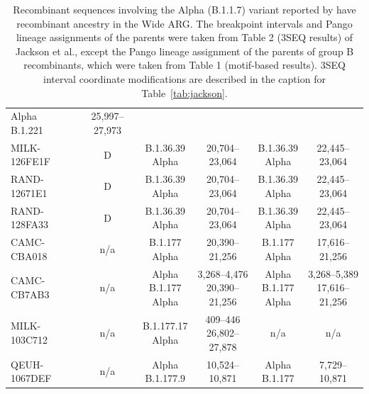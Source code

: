 \documentclass{article}
\begin{document}
\begin{table}
\begin{tabular}{l|c|c|c|c|c}
    \thead{Alpha \\ B.1.221} & 25,997--27,973 \\
MILK-126FE1F & D &
    \thead{B.1.36.39 \\ Alpha} & 20,704--23,064 &
    \thead{B.1.36.39 \\ Alpha} & 22,445--23,064 \\
RAND-12671E1 & D &
    \thead{B.1.36.39 \\ Alpha} & 20,704--23,064 &
    \thead{B.1.36.39 \\ Alpha} & 22,445--23,064 \\
RAND-128FA33 & D &
    \thead{B.1.36.39 \\ Alpha} & 20,704--23,064 &
    \thead{B.1.36.39 \\ Alpha} & 22,445--23,064 \\
CAMC-CBA018 & n/a &
    \thead{B.1.177 \\ Alpha} & 20,390--21,256 &
    \thead{B.1.177 \\ Alpha} & 17,616--21,256 \\
CAMC-CB7AB3 & n/a &
    \thead{Alpha \\ B.1.177 \\ Alpha} & \thead{3,268--4,476 \\ 20,390--21,256} &
    \thead{Alpha \\ B.1.177 \\ Alpha} & \thead{3,268--5,389\\17,616--21,256} \\
MILK-103C712 & n/a &
    \thead{B.1.177.17 \\ Alpha} & \thead{409--446 \\ 26,802--27,878} &
    n/a & n/a \\
QEUH-1067DEF & n/a &
    \thead{Alpha \\ B.1.177.9} & 10,524--10,871 &
    \thead{Alpha \\ B.1.177} & 7,729--10,871 \\ \hline
\end{tabular}
\caption{\label{tab:jackson_supplement}
Recombinant sequences involving the
Alpha (B.1.1.7) variant reported by \cite{Jackson2021-ik} have recombinant
ancestry in the Wide ARG. The breakpoint intervals and Pango lineage
assignments of the parents were taken from Table 2 (3SEQ results) of Jackson et
al., except the Pango lineage assignment of the parents of group B
recombinants, which were taken from Table 1 (motif-based results).
3SEQ interval coordinate modifications are described in the caption for
Table~\ref{tab:jackson}.}
\end{table}
\end{document}
